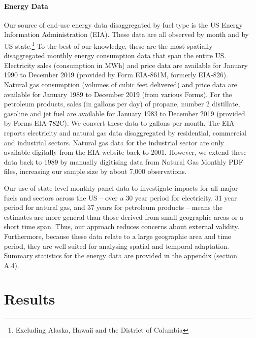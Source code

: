 \documentclass[11pt]{article}
\begin{document}
\paragraph*{Energy Data} Our source of end-use energy data disaggregated by fuel type is the US Energy Information Administration (EIA). These data are all observed by month and by US state.\footnote{ Excluding Alaska, Hawaii and the District of Columbia} To the best of our knowledge, these are the most spatially disaggregated monthly energy consumption data that span the entire US. Electricity sales (consumption in MWh) and price data are available for January 1990 to December 2019 (provided by Form EIA-861M, formerly EIA-826). Natural gas consumption (volumes of cubic feet delivered) and price data are available for January 1989 to December 2019 (from various Forms). For the petroleum products, sales (in gallons per day) of propane, number 2 distillate, gasoline and jet fuel are available for January 1983 to December 2019 (provided by Forms EIA-782C). We convert these data to gallons per month. The EIA reports electricity and natural gas data disaggregated by residential, commercial and industrial sectors. Natural gas data for the industrial sector are only available digitally from the EIA website back to 2001. However, we extend these data back to 1989 by manually digitising data from Natural Gas Monthly PDF files, increasing our sample size by about 7,000 observations.

Our use of state-level monthly panel data to investigate impacts for all major fuels and sectors across the US -- over a 30 year period for electricity, 31 year period for natural gas, and 37 years for petroleum products -- means the estimates are more general than those derived from small geographic areas or a short time span. Thus, our approach reduces concerns about external validity. Furthermore, because these data relate to a large geographic area and time period, they are well suited for analysing spatial and temporal adaptation. Summary statistics for the energy data are provided in the appendix (section A.4).
	

\section{Results \label{results}}
\end{document}
